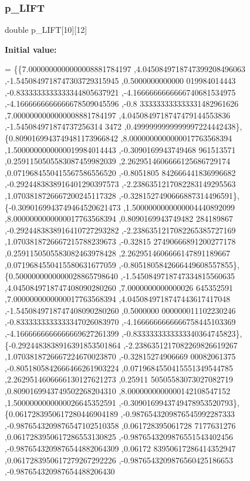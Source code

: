 \subsubsection{\texorpdfstring{p\+\_\+\+L\+I\+FT}{p\_LIFT}}
{\footnotesize\ttfamily double p\+\_\+\+L\+I\+FT\mbox{[}10\mbox{]}\mbox{[}12\mbox{]}}

{\bfseries Initial value\+:}
\begin{DoxyCode}
= \{\{7.0000000000000008881784197 ,4.0450849718747399208496063 ,-1.5450849718747303729315945 ,0.5000000000000
      019984014443 ,-0.8333333333333344805637921 ,-4.1666666666666740681534975 ,-4.1666666666666678509045596 ,-0.8
      333333333333331482961626 ,7.0000000000000008881784197 ,4.0450849718747479144553836 ,-1.545084971874737256314
      3472 ,0.4999999999999997224442438\},
\{0.8090169943749481173966842 ,8.0000000000000017763568394 ,1.5000000000000019984014443 ,-0.3090169943749468
      961513571 ,0.2591150505583087459982039 ,2.2629514606666125686729174 ,0.0719684550415567586556520 ,-0.8051805
      842666441836996682 ,-0.2924483838916401290397573 ,-2.2386351217082283149295563 ,1.0703818726667200245117328 
      ,-0.3281527490666887314496591\},
\{-0.3090169943749464520621473 ,1.5000000000000004440892099 ,8.0000000000000017763568394 ,0.8090169943749482
      284189867 ,-0.2924483838916410727293282 ,-2.2386351217082265385727169 ,1.0703818726667215788239673 ,-0.32815
      27490666891200277178 ,0.2591150505583082463978428 ,2.2629514606666147891189667 ,0.0719684550415580631677059 
      ,-0.8051805842666449608557855\},
\{0.5000000000000028865798640 ,-1.5450849718747334815560635 ,4.0450849718747408090280260 ,7.0000000000000026
      645352591 ,7.0000000000000017763568394 ,4.0450849718747443617417048 ,-1.5450849718747408090280260 ,0.5000000
      000000011102230246 ,-0.8333333333333347026083970 ,-4.1666666666666758445103369 ,-4.1666666666666669627261399
       ,-0.8333333333333340364745823\},
\{-0.2924483838916391853501864 ,-2.2386351217082269826619267 ,1.0703818726667224670023870 ,-0.32815274906669
      00082061375 ,-0.8051805842666466261903224 ,0.0719684550415551349544785 ,2.2629514606666130127621273 ,0.25911
      50505583073027082719 ,0.8090169943749502268204310 ,8.0000000000000142108547152 ,1.5000000000000026645352591 
      ,-0.3090169943749478953520793\},
\{0.0617283950617280446904189 ,-0.9876543209876545992287333 ,-0.9876543209876547102510358 ,0.061728395061728
      7177631276 ,0.0617283950617286553130825 ,-0.9876543209876551543402456 ,-0.9876543209876544882064309 ,0.06172
      83950617286414352947 ,0.0617283950617279267292226 ,-0.9876543209876560425186653 ,-0.987654320987654488206430

\end{DoxyCode}
